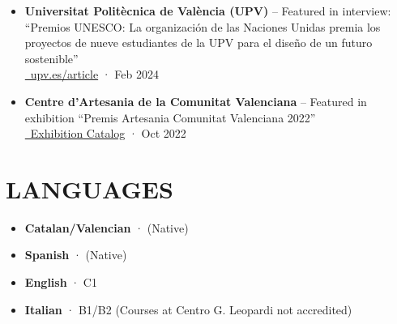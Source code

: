 \documentclass[11pt,a4paper]{article}
\begin{document}
\begin{itemize}[leftmargin=*,label={},itemsep=2pt]
    \item \textbf{Universitat Politècnica de València (UPV)} -- Featured in interview: ``Premios UNESCO: La organización de las Naciones Unidas premia los proyectos de nueve estudiantes de la UPV para el diseño de un futuro sostenible''\\
    \href{https://www.upv.es/noticias-upv/noticia-14469-premios-unesco-es.html}{\faUniversity\ upv.es/article} · Feb 2024
    
    \item \textbf{Centre d'Artesania de la Comunitat Valenciana} -- Featured in exhibition ``Premis Artesania Comunitat Valenciana 2022''\\
    \href{https://www.centroartesaniacv.com/galeria/documentos/1672397676_1.PDF}{\faFilePdf \ Exhibition Catalog} · Oct 2022
\end{itemize}

\section*{LANGUAGES}
\begin{itemize}[leftmargin=*,label={},itemsep=2pt]
    \item \textbf{Catalan/Valencian} · (Native)

    \item \textbf{Spanish} · (Native)
    
    \item \textbf{English} · C1
    
    \item \textbf{Italian} · B1/B2 (Courses at Centro G. Leopardi not accredited)
\end{itemize}

\end{document}
